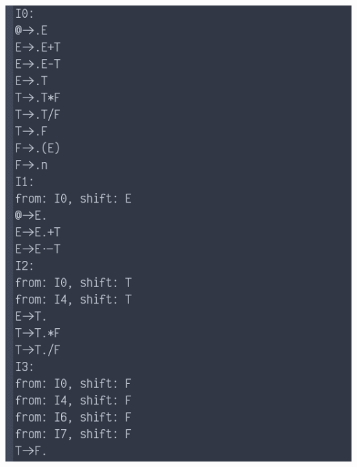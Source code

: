 \documentclass[fontset=none,UTF8,a4paper,zihao=-4]{ctexart}
\begin{document}
\begin{itemize}
\begin{center}
\includegraphics[width=.9\linewidth]{运行截图/2020-11-26_00-45-19_screenshot.png}
\end{center}


\end{itemize}
\end{document}
